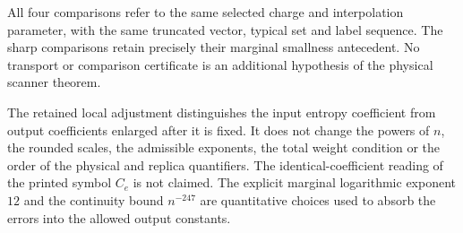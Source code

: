 \documentclass{article}
\begin{document}
All four comparisons refer to the same selected charge and interpolation
parameter, with the same truncated vector, typical set and label sequence.
The sharp comparisons retain precisely their marginal smallness
antecedent. No transport or comparison certificate is an additional
hypothesis of the physical scanner theorem.

The retained local adjustment distinguishes the input entropy coefficient
from output coefficients enlarged after it is fixed. It does not change
the powers of $n$, the rounded scales, the admissible exponents, the total
weight condition or the order of the physical and replica quantifiers.
The identical-coefficient reading of the printed symbol $C_e$ is not
claimed. The explicit marginal logarithmic exponent $12$ and the
continuity bound $n^{-247}$ are quantitative choices used to absorb the
errors into the allowed output constants.



\end{document}
